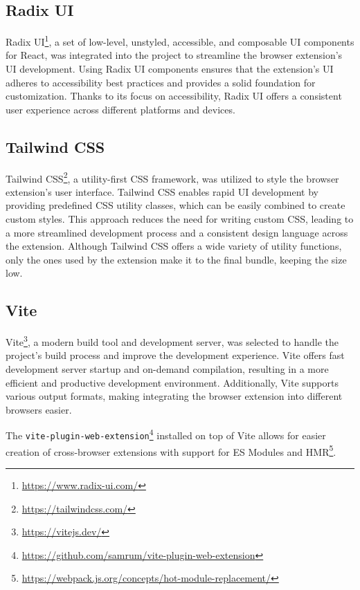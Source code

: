 \subsection{Radix UI}

Radix UI\footnote{\url{https://www.radix-ui.com/}}, a set of low-level, unstyled, accessible, and composable UI components for React, was integrated into the project to streamline the browser extension's UI development. Using Radix UI components ensures that the extension's UI adheres to accessibility best practices and provides a solid foundation for customization. Thanks to its focus on accessibility, Radix UI offers a consistent user experience across different platforms and devices.

\subsection{Tailwind CSS}

Tailwind CSS\footnote{\url{https://tailwindcss.com/}}, a utility-first CSS framework, was utilized to style the browser extension's user interface. Tailwind CSS enables rapid UI development by providing predefined CSS utility classes, which can be easily combined to create custom styles. This approach reduces the need for writing custom CSS, leading to a more streamlined development process and a consistent design language across the extension. Although Tailwind CSS offers a wide variety of utility functions, only the ones used by the extension make it to the final bundle, keeping the size low.

\subsection{Vite}

Vite\footnote{\url{https://vitejs.dev/}}, a modern build tool and development server, was selected to handle the project's build process and improve the development experience. Vite offers fast development server startup and on-demand compilation, resulting in a more efficient and productive development environment. Additionally, Vite supports various output formats, making integrating the browser extension into different browsers easier. 
	
The \texttt{vite-plugin-web-extension}\footnote{\url{https://github.com/samrum/vite-plugin-web-extension}} installed on top of Vite allows for easier creation of cross-browser extensions with support for ES Modules and HMR\footnote{\url{https://webpack.js.org/concepts/hot-module-replacement/}}.


